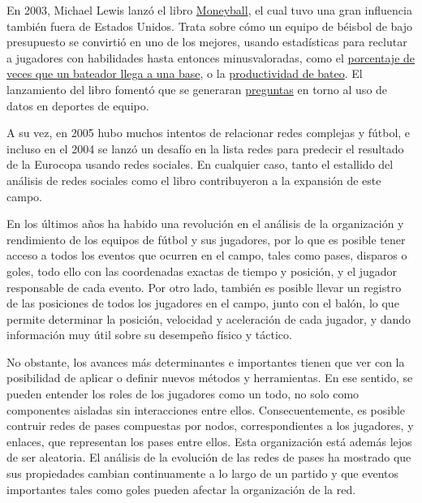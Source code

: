 En 2003, Michael Lewis lanzó el libro \href{https://en.wikipedia.org/wiki/Moneyball}{Moneyball}, el cual tuvo una gran 
influencia también fuera de Estados Unidos. Trata sobre cómo
un equipo de béisbol de bajo presupuesto se convirtió en uno de los mejores, usando estadísticas para reclutar a jugadores 
con habilidades hasta entonces minusvaloradas, como el \href{https://en.wikipedia.org/wiki/On-base_percentage}{porcentaje de veces que un bateador llega a una base}, o 
la \href{https://en.wikipedia.org/wiki/Slugging_percentage}{productividad de bateo}\cite{moneyball-ev}. El lanzamiento del 
libro fomentó que se generaran \href{https://thesportjournal.org/article/an-examination-of-the-moneyball-theory-a-baseball-statistical-analysis/}{preguntas} en torno al uso de datos en deportes de equipo. 

A su vez, en 2005 hubo muchos intentos de relacionar redes complejas y fútbol\cite{lee2005passes}, 
e incluso en el 2004 se lanzó un desafío en la lista redes\cite{Bundio_Matías_2008} para predecir el resultado de la Eurocopa usando 
redes sociales. En cualquier caso, tanto el estallido del análisis de redes sociales como el libro contribuyeron 
a la expansión de este campo.

En los últimos años ha habido una revolución en el análisis de la organización 
y rendimiento de los equipos de fútbol y sus jugadores, por lo que es posible tener acceso a todos los 
eventos que ocurren en el campo, tales como pases, disparos o goles, todo ello con las coordenadas 
exactas de tiempo y posición, y el jugador responsable de cada evento. Por otro lado, también es 
posible llevar un registro de las posiciones de todos los jugadores en el campo, junto con el balón, 
lo que permite determinar la posición, velocidad y aceleración de cada jugador, y dando información 
muy útil sobre su desempeño físico y táctico. 

No obstante, los avances más determinantes e importantes tienen que ver con la posibilidad de aplicar o 
definir nuevos métodos y herramientas. En ese sentido, se pueden entender los roles de los jugadores 
como un todo, no solo como componentes aisladas sin interacciones entre ellos. Consecuentemente, es 
posible contruir redes de pases compuestas por nodos, correspondientes a los jugadores, y enlaces, 
que representan los pases entre ellos. Esta organización está además lejos de ser 
aleatoria. El análisis de la evolución de las redes de pases ha mostrado que sus propiedades 
cambian continuamente a lo largo de un partido y que eventos importantes tales como goles 
pueden afectar la organización de la red\cite{spatial-and-temporal-entropies}.

